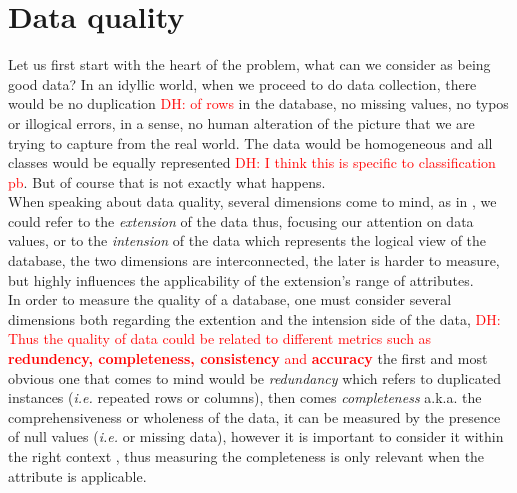\documentclass{article}
\newcommand\dhawat[1]{\textcolor{red}{DH: #1}}
\begin{document}
\section{Data quality} %
\label{sec:Data quality}
Let us first start with the heart of the problem, what can we consider as being good data? In an idyllic world, when we proceed to do data collection, there would be no duplication \dhawat{of rows} in the database, no missing values, no typos or illogical errors, in a sense, no human alteration of the picture that we are trying to capture from the real world. The data would be homogeneous and all classes would be equally represented \dhawat{I think this is specific to classification pb}. But of course that is not exactly what happens. \\
When speaking about data quality, several dimensions come to mind, as in \cite{amazon}, we could refer to the \textit{extension} of the data thus, focusing our attention on data values, or to the \textit{intension} of the data which represents the logical view of the database, the two dimensions are interconnected, the later is harder to measure, but highly influences the applicability of the extension's range of attributes.\\
In order to measure the quality of a database, one must consider several dimensions both regarding the extention and the intension side of the data, \dhawat{Thus the quality of data could be related to different metrics such as \textbf{redundency, completeness, consistency} and \textbf{accuracy }} the first and most obvious one that comes to mind would be \textit{redundancy} which refers to duplicated instances (\textit{i.e.} repeated rows or columns), then comes \textit{completeness} a.k.a. the comprehensiveness or wholeness of the data, it can be measured by the presence of null values (\textit{i.e.} or missing data), however it is important to consider it within the right context  \cite{amazon}, thus measuring the completeness is only relevant when the attribute is applicable. \\
\end{document}
